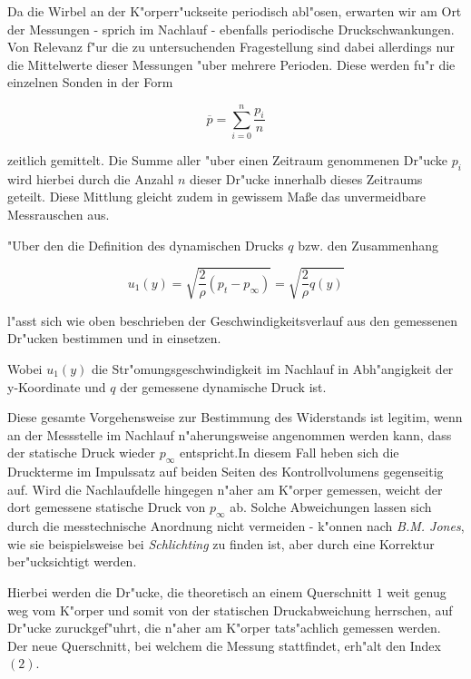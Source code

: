 Da die Wirbel an der K"orperr"uckseite periodisch abl"osen, erwarten wir am Ort der Messungen - sprich im Nachlauf - ebenfalls periodische Druckschwankungen.
Von Relevanz f"ur die zu untersuchenden Fragestellung sind dabei allerdings nur die Mittelwerte dieser Messungen "uber mehrere Perioden.
Diese werden fu"r die einzelnen Sonden in der Form
\begin{center}	
	\begin{equation}
		\overline{p}=\sum_{i=0}^{n}\frac{p_i}{n}
	\end{equation}
\end{center}
zeitlich gemittelt.
Die Summe aller "uber einen Zeitraum genommenen Dr"ucke $p_i$ wird hierbei durch die Anzahl $n$ dieser Dr"ucke innerhalb dieses Zeitraums geteilt.
Diese Mittlung gleicht zudem in gewissem Ma\ss{}e das unvermeidbare Messrauschen aus.

"Uber den die Definition des dynamischen Drucks $q$ bzw. den Zusammenhang
\begin{center}
	\begin{equation}
		\label{geschwindigkeitsformel}
		u_{1}(y)= \sqrt{\frac{2}{\rho}(p_t - p_{\infty}) } = \sqrt{\frac{2}{\rho} q(y)}
	\end{equation}
\end{center}
l"asst sich wie oben beschrieben der Geschwindigkeitsverlauf aus den gemessenen Dr"ucken bestimmen und in  einsetzen.

Wobei $u_{1}(y)$ die Str"omungsgeschwindigkeit im Nachlauf in Abh"angigkeit der y-Koordinate und $q$ der gemessene dynamische Druck ist.

Diese gesamte Vorgehensweise zur Bestimmung des Widerstands ist legitim, wenn an der Messstelle im Nachlauf n"aherungsweise angenommen werden kann, dass der statische Druck wieder $p_\infty$ entspricht.In diesem Fall heben sich die Druckterme im Impulssatz auf  beiden Seiten des Kontrollvolumens gegenseitig auf.
Wird die Nachlaufdelle hingegen n"aher am K"orper gemessen, weicht der dort gemessene statische Druck von $p_{\infty}$ ab.
Solche Abweichungen lassen sich durch die messtechnische Anordnung nicht vermeiden - 
k"onnen nach \textit{B.M. Jones}, wie sie beispielsweise bei \textit{Schlichting} \cite{Schlichting.2001} zu finden ist, aber durch eine Korrektur ber"ucksichtigt werden.

Hierbei werden die Dr"ucke, die theoretisch an einem Querschnitt $1$  weit genug weg vom K"orper und somit von der statischen Druckabweichung herrschen, auf Dr"ucke zuruckgef"uhrt, die n"aher am K"orper tats"achlich gemessen werden.
Der neue Querschnitt, bei welchem die Messung stattfindet, erh"alt den Index $(2)$.

